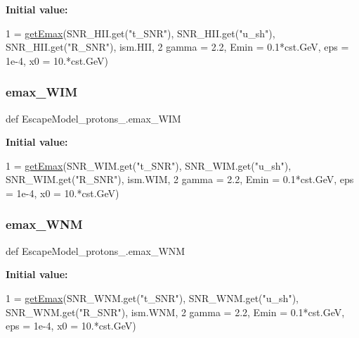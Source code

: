 {\bfseries Initial value\+:}
\begin{DoxyCode}
1 =  \hyperlink{namespaceEscapeModel__protons__2_a178d4eb6e1bea7a052df9bc9680f3af4}{getEmax}(SNR\_HII.get(\textcolor{stringliteral}{"t\_SNR"}), SNR\_HII.get(\textcolor{stringliteral}{"u\_sh"}), SNR\_HII.get(\textcolor{stringliteral}{"R\_SNR"}), ism.HII, 
2                    gamma = 2.2, Emin = 0.1*cst.GeV, eps = 1e-4, x0 = 10.*cst.GeV)
\end{DoxyCode}
\mbox{\label{namespaceEscapeModel__protons__2_af86cc929ced5a0922cde669769a9f1e5}} 
\subsubsection{\texorpdfstring{emax\+\_\+\+W\+IM}{emax\_WIM}}
{\footnotesize\ttfamily def Escape\+Model\+\_\+protons\+\_.\+emax\+\_\+\+W\+IM}

{\bfseries Initial value\+:}
\begin{DoxyCode}
1 =  \hyperlink{namespaceEscapeModel__protons__2_a178d4eb6e1bea7a052df9bc9680f3af4}{getEmax}(SNR\_WIM.get(\textcolor{stringliteral}{"t\_SNR"}), SNR\_WIM.get(\textcolor{stringliteral}{"u\_sh"}), SNR\_WIM.get(\textcolor{stringliteral}{"R\_SNR"}), ism.WIM, 
2                    gamma = 2.2, Emin = 0.1*cst.GeV, eps = 1e-4, x0 = 10.*cst.GeV)
\end{DoxyCode}
\mbox{\label{namespaceEscapeModel__protons__2_aecfee6e8c0bd69fcea50b0d823e3b065}} 
\subsubsection{\texorpdfstring{emax\+\_\+\+W\+NM}{emax\_WNM}}
{\footnotesize\ttfamily def Escape\+Model\+\_\+protons\+\_.\+emax\+\_\+\+W\+NM}

{\bfseries Initial value\+:}
\begin{DoxyCode}
1 =  \hyperlink{namespaceEscapeModel__protons__2_a178d4eb6e1bea7a052df9bc9680f3af4}{getEmax}(SNR\_WNM.get(\textcolor{stringliteral}{"t\_SNR"}), SNR\_WNM.get(\textcolor{stringliteral}{"u\_sh"}), SNR\_WNM.get(\textcolor{stringliteral}{"R\_SNR"}), ism.WNM, 
2                    gamma = 2.2, Emin = 0.1*cst.GeV, eps = 1e-4, x0 = 10.*cst.GeV)
\end{DoxyCode}
\mbox{\label{namespaceEscapeModel__protons__2_ab9e89e306207ef87dfe97dcc618ba79f}} 
